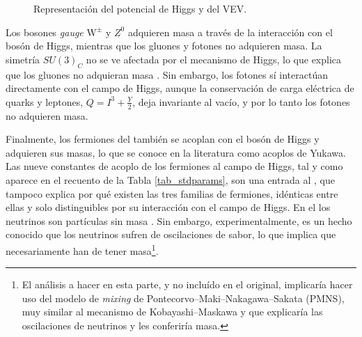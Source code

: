 \begin{figure}[H]
\centering

\color{norm}


\caption{Representación del potencial de Higgs y del VEV.} \label{fig_higgspot}  
\end{figure}



Los bosones \emph{gauge} $\mathrm{W}^{\pm}$ y $Z^0$ adquieren masa a través de la interacción con el bosón de Higgs, mientras que los gluones y fotones no adquieren masa. La simetría $SU(3)_C$ no se ve afectada por el mecanismo de Higgs, lo que explica que los gluones no adquieran masa%
. Sin embargo, los fotones sí interactúan directamente con el campo de Higgs, aunque la conservación de carga eléctrica de quarks y leptones, $Q = I^3 + \frac{Y}{2}$, deja invariante al vacío, y por lo tanto los fotones no adquieren masa. 

Finalmente, los fermiones del \stdmod también se acoplan con el bosón de Higgs y adquieren sus masas, lo que se conoce en la literatura como acoplos de Yukawa. Las nueve constantes de acoplo de los fermiones al campo de Higgs, tal y como aparece en el recuento de la Tabla \ref{tab_stdparams}, son una entrada al \stdmod, que tampoco  explica por qué existen las tres familias de fermiones, idénticas entre ellas y solo distinguibles por su interacción con el campo de Higgs. En el \stdmod los neutrinos son partículas sin masa%
. Sin embargo, experimentalmente, es un hecho conocido que los neutrinos sufren de oscilaciones de sabor, lo que implica que necesariamente han de tener masa\footnote{\label{fn_pmns}El análisis a hacer en esta parte, y no incluído en el \stdmod original, implicaría hacer uso del modelo de \emph{mixing} de Pontecorvo--Maki--Nakagawa--Sakata (PMNS), muy similar al mecanismo de Kobayashi--Maskawa y que explicaría las oscilaciones de neutrinos y les conferiría masa.}.



